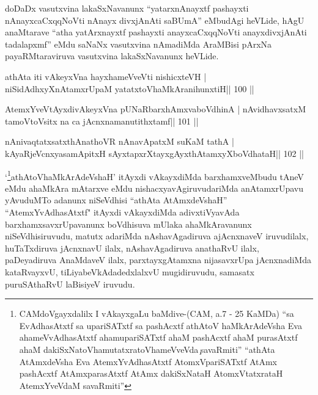 \begin{artha}
doDaDx vasutxvina lakaSxNavanunx ``\footnotemark[1]yatarxnAnayxtf 
pashayxti nAnayxcaCxqqNoVti nAnayx divxjAnAti saBUmA'' eMbudAgi
heVLide, hAgU anaMtarave ``\footnotemark[1]atha yatArxnayxtf pashayxti
anayxcaCxqqNoVti anayxdivxjAnAti tadalapxmf'' eMdu saNaNx vasutxvina
nAmadiMda AraMBisi pArxNa payaRMtaraviruva vasutxvina lakaSxNavanunx
heVLide. 
\end{artha}


\begin{shl}
athAta iti vAkeyxVna hayxhameVveVti nishicxteVH |
niSidAdhxyXnAtamxrUpaM yatatxtoV\s haMkAranihunxtiH\hfill || 100 ||
\end{shl}

\begin{shl}
AtemxYveVtAyxdivAkeyxVna pUNaRbarxhAmxvaboVdhinA |
nAvidhavxsatxM tamoV\s toV\s sitx na ca jAcnxnamanutithxtamf\hfill || 101 ||
\end{shl}

\begin{shl}
nAnivaqtatxsatxthA\s nathoVR nAnavApatxM suKaM tathA |
kAyaRjeVcnxyasamApitxH sAyxtapxrXtayxgAyxthAtamxyXboVdhataH\hfill || 102 ||
\end{shl}

\begin{artha}
`\footnote{CAMdoVgayxdalilx I vAkayxgaLu baMdive-(CAM, a.7 - 25
    KaMDa) ``sa EvAdhasAtxtf sa upariSATxtf sa pashAcxtf athAtoV\s
    haMkArAdeVsha Eva ahameVvAdhasAtxtf ahamupariSATxtf ahaM pashAcxtf
  ahaM purasAtxtf ahaM dakiSxNatoV\s hamutatxratoV\s hameVveVda\c\ savaRmiti'' ``athAta AtAmxdeVsha Eva AtemxYvAdhasAtxtf
  AtomxVpariSATxtf AtAmx pashAcxtf AtAmxparasAtxtf AtAmx dakiSxNataH
  AtomxVtatxrataH AtemxYveVdaM savaRmiti''}athAtoV\s haMkArAdeVshaH' 
  itAyxdi vAkayxdiMda barxhamxveMbudu tAneV eMdu ahaMkAra mAtarxve eMdu
  nishacxyavAgiruvudariMda anAtamxrUpavu yAvuduMTo adanunx niSeVdhisi
  ``athAta AtAmxdeVshaH'' ``AtemxYvAdhasAtxtf" itAyxdi vAkayxdiMda
  adivxtiVyavAda barxhamxsavxrUpavanunx boVdhisuva mUlaka
  ahaMkAravanunx niSeVdhisiruvudu, matutx adariMda nAshavAgadiruva
  ajAcnxnaveV iruvudilalx, huTaTxdiruva jAcnxnavU ilalx,
  nAshavAgadiruva anathaRvU ilalx, paDeyadiruva AnaMdaveV ilalx,
  parxtayxgAtamxna nijasavxrUpa jAcnxnadiMda kataRvayxvU,
  tiLiyabeVkAdadedxlalxvU mugidiruvudu, samasatx puruSAthaRvU laBisiyeV
  iruvudu.
\end{artha}

